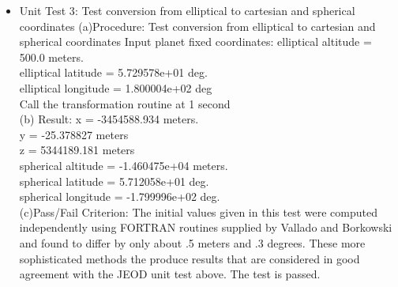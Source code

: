 \documentclass[twoside,11pt,titlepage]{report}
\begin{document}
\begin{itemize}
\item{Unit Test 3}:\label{unit3}\newline
Test conversion from elliptical to cartesian and spherical coordinates
(a)Procedure:\newline
Test conversion from elliptical to cartesian and spherical coordinates
Input planet fixed coordinates:
elliptical altitude = 500.0 meters.\\
elliptical latitude = 5.729578e+01 deg.\\
elliptical longitude = 1.800004e+02  deg\\
Call the transformation routine at 1 second\\
(b) Result:\newline
x  = -3454588.934 meters.\\
y  = -25.378827 meters\\
z  = 5344189.181 meters\\
spherical altitude = -1.460475e+04 meters.\\
spherical latitude = 5.712058e+01  deg.\\
spherical longitude = -1.799996e+02 deg.\\
(c){Pass/Fail Criterion}:\newline
The initial values given in this test were computed independently
using FORTRAN routines supplied by Vallado \cite{VMcc} and Borkowski \cite{bor}
and found to differ by only about .5 meters and .3 degrees. These more
sophisticated methods the produce results that are considered in good agreement
with the JEOD unit test above.
The test is passed.


\end{itemize}
\end{document}

